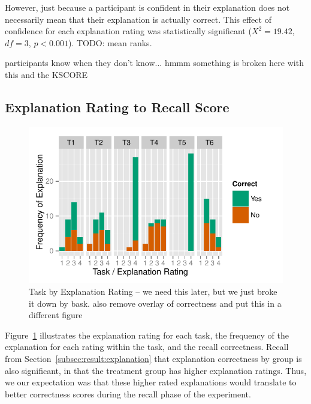 \documentclass[conference]{IEEEtran}
\begin{document}
However, just because a participant is confident in their explanation does not necessarily mean that their explanation is actually correct. This effect of confidence for each explanation rating was statistically significant ($X^2 = 19.42$, $df = 3$, $p < 0.001$). TODO: mean ranks.

participants know when they don't know... hmmm something is broken here with this and the KSCORE


\subsection{Explanation Rating to Recall Score}

\begin{figure}[!t]
\centering
\includegraphics[width=\columnwidth]{explanation_by_task}
\caption{Task by Explanation Rating -- we need this later, but we just broke it down by bask. also remove overlay of correctness and put this in a different figure}\label{fig:explanationbytask}
\end{figure}

Figure~\ref{fig:explanationbytask} illustrates the explanation rating for each task, the frequency of the explanation for each rating within the task, and the recall correctness. Recall from Section~\ref{subsec:result:explanation} that explanation correctness by group is also significant, in that the treatment group has higher explanation ratings. Thus, we our expectation was that these higher rated explanations would translate to better correctness scores during the recall phase of the experiment.
\end{document}
